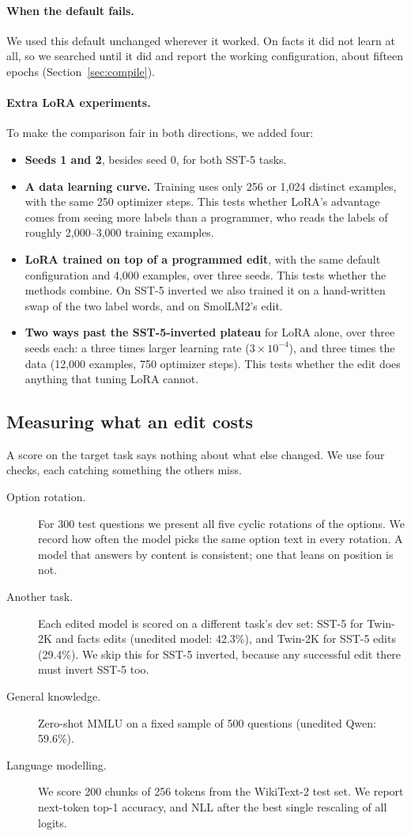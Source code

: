 \paragraph{When the default fails.} We used this default unchanged wherever it worked. On facts it did not learn at all, so we searched until it did and report the working configuration, about fifteen epochs (Section~\ref{sec:compile}).

\paragraph{Extra LoRA experiments.} To make the comparison fair in both directions, we added four:
\begin{itemize}
  \item \textbf{Seeds 1 and 2}, besides seed 0, for both SST-5 tasks.
  \item \textbf{A data learning curve.} Training uses only 256 or 1,024 distinct examples, with the same 250 optimizer steps. This tests whether LoRA's advantage comes from seeing more labels than a programmer, who reads the labels of roughly 2,000--3,000 training examples.
  \item \textbf{LoRA trained on top of a programmed edit}, with the same default configuration and 4,000 examples, over three seeds. This tests whether the methods combine. On SST-5 inverted we also trained it on a hand-written swap of the two label words, and on SmolLM2's edit.
  \item \textbf{Two ways past the SST-5-inverted plateau} for LoRA alone, over three seeds each: a three times larger learning rate ($3\times10^{-4}$), and three times the data (12,000 examples, 750 optimizer steps). This tests whether the edit does anything that tuning LoRA cannot.
\end{itemize}

\subsection{Measuring what an edit costs}
A score on the target task says nothing about what else changed. We use four checks, each catching something the others miss.
\begin{description}
  \item[Option rotation.] For 300 test questions we present all five cyclic rotations of the options. We record how often the model picks the same option text in every rotation. A model that answers by content is consistent; one that leans on position is not.
  \item[Another task.] Each edited model is scored on a different task's dev set: SST-5 for Twin-2K and facts edits (unedited model: 42.3\%), and Twin-2K for SST-5 edits (29.4\%). We skip this for SST-5 inverted, because any successful edit there must invert SST-5 too.
  \item[General knowledge.] Zero-shot MMLU on a fixed sample of 500 questions (unedited Qwen: 59.6\%).
  \item[Language modelling.] We score 200 chunks of 256 tokens from the WikiText-2 test set. We report next-token top-1 accuracy, and NLL after the best single rescaling of all logits.
\end{description}

